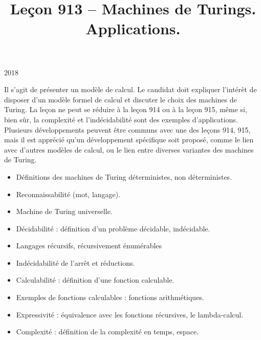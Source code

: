 \documentclass{agregfiche}
\title{Leçon 913 -- Machines de Turings. Applications.}
\begin{document}
\maketitle

\secrapports

\begin{rapport}{2018}

Il s'agit de présenter un modèle de calcul.
Le candidat doit expliquer l'intérêt de disposer d'un modèle formel de calcul et discuter le choix des machines de Turing.
La leçon ne peut se réduire à la leçon 914 ou à la leçon 915, même si, bien sûr, la complexité et l'indécidabilité sont des exemples d'applications.
Plusieurs développements peuvent être communs avec une des leçons 914, 915, mais il est apprécié qu'un développement spécifique soit proposé, comme le lien avec d'autres modèles de calcul, ou le lien entre diverses variantes des machines de Turing.

\end{rapport}

\secindispensables

\begin{itemize}
    \item Définitions des machines de Turing déterministes, non déterministes.
    \item Reconnaissabilité (mot, langage).
    \item Machine de Turing universelle.
\end{itemize}


\secasavoir


\begin{itemize}
	\item Décidabilité : définition d'un problème décidable, indécidable.
	\item Langages récursifs, récursivement énumérables
	\item Indécidabilité de l'arrêt et réductions.
	\item Calculabilité : définition d'une fonction calculable.
	\item Exemples de fonctions calculables : fonctions arithmétiques.
	\item Expressivité : équivalence avec les fonctions récursives, le lambda-calcul.
	\item Complexité : définition de la complexité en temps, espace.
\end{itemize}


\secidees
\end{document}
